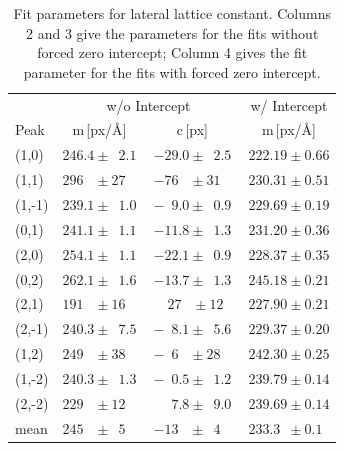 \documentclass[a4paper,10pt]{scrartcl}
\begin{document}
\begin{table}
\begin{center}
\begin{tabular}{lccc}
\toprule
       & \multicolumn{2}{c}{w/o Intercept}                                                     & w/ Intercept      \\
\cmidrule(r){2-4}
Peak   & m\,[px/\AA]                          & c\,[px]                                        & m\,[px/\AA]       \\
\midrule
(1,0)  & $246.4 \pm \phantom{0}2.1$           & $-29.0 \pm \phantom{0}2.5$                     & $222.19 \pm 0.66$ \\ 
(1,1)  & $296\phantom{.0} \pm 27\phantom{.0}$ & $-76\phantom{.0} \pm 31\phantom{.0}$           & $230.31 \pm 0.51$ \\ 
(1,-1) & $239.1 \pm \phantom{0}1.0$           & $-\phantom{0}9.0 \pm \phantom{0}0.9$           & $229.69 \pm 0.19$ \\ 
(0,1)  & $241.1 \pm \phantom{0}1.1$           & $-11.8 \pm \phantom{0}1.3$                     & $231.20 \pm 0.36$ \\ 
(2,0)  & $254.1 \pm \phantom{0}1.1$           & $-22.1 \pm \phantom{0}0.9$                     & $228.37 \pm 0.35$ \\ 
(0,2)  & $262.1 \pm \phantom{0}1.6$           & $-13.7 \pm \phantom{0}1.3$                     & $245.18 \pm 0.21$ \\ 
(2,1)  & $191\phantom{.0} \pm 16\phantom{.0}$ & $\phantom{-}27\phantom{.0} \pm 12\phantom{.0}$ & $227.90 \pm 0.21$ \\ 
(2,-1) & $240.3 \pm \phantom{0}7.5$           & $-\phantom{0}8.1 \pm \phantom{0}5.6$           & $229.37 \pm 0.20$ \\ 
(1,2)  & $249\phantom{.0} \pm 38\phantom{.0}$ & $-\phantom{0}6\phantom{.0} \pm 28\phantom{.0}$ & $242.30 \pm 0.25$ \\ 
(1,-2) & $240.3 \pm \phantom{0}1.3$           & $-\phantom{0}0.5 \pm \phantom{0}1.2$           & $239.79 \pm 0.14$ \\ 
(2,-2) & $229\phantom{.0} \pm 12\phantom{.0}$ & $\phantom{-0}7.8 \pm \phantom{0}9.0$           & $239.69 \pm 0.14$ \\ 
mean   & $245\phantom{.0} \pm \phantom{0}5\phantom{.0}$ & $-13\phantom{.0} \pm \phantom{0}4\phantom{.0}$ & $233.3\phantom{0} \pm 0.1\phantom{0}$ \\ 
\bottomrule
\end{tabular}
\end{center}
\par
\caption{Fit parameters for lateral lattice constant. Columns 2 and 3 give the parameters for the fits without forced zero intercept; Column 4 gives the fit parameter for the fits with forced zero intercept.\label{tab:latticedata}}
\end{table}
\end{document}
